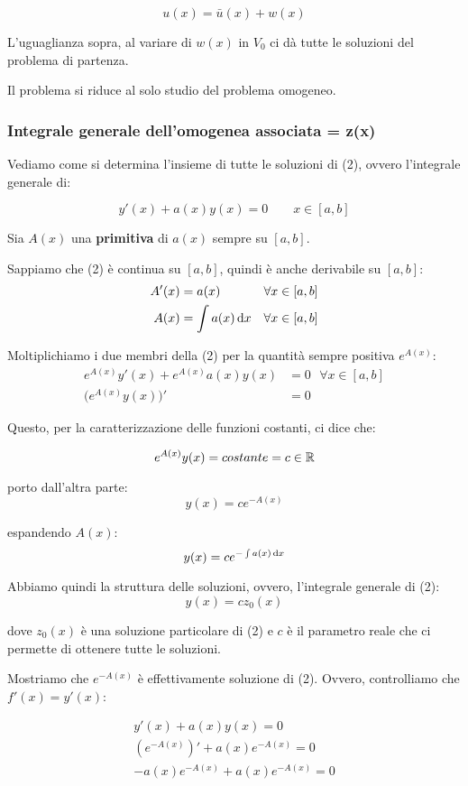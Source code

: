 \[
    u(x) = \bar u(x) +w(x)
\]

L'uguaglianza sopra, al variare di \(w(x)\) in \(V_0\) ci dà tutte le soluzioni del problema di partenza.

Il problema si riduce al solo studio del problema omogeneo.

\subsubsection{Integrale generale dell'omogenea associata = z(x)}

Vediamo come si determina l'insieme di tutte le soluzioni di (2), ovvero l'integrale generale di:

\[
    y'(x)+a(x)y(x) = 0 \qquad x \in [a,b]
\]

Sia \(A(x)\) una \textbf{primitiva} di \(a(x)\) sempre su \([a,b]\).

Sappiamo che (2) è continua su \([a,b]\), quindi è anche derivabile su \([a,b]\):
\medskip
\begin{align*}
    A'(x) & = a(x)              & \forall x \in [a,b] \\
    A(x)  & = \int a(x) \mathop{}\!\mathrm{d} x & \forall x \in [a,b]
\end{align*}

Moltiplichiamo i due membri della (2) per la quantità sempre positiva \(e^{A(x)}\):
\medskip
\begin{align*}
    e^{A(x)} y'(x) + e ^{A(x)}a(x) y(x) & = 0\ \ \ \forall x \in [a,b] \\
    \bigl(e^{A(x)} y(x)\bigr)'          & = 0
\end{align*}

Questo, per la caratterizzazione delle funzioni costanti, ci dice che:

\[
    e ^{A(x)}y(x) = costante = c \in \mathbb{R}
\]

porto dall'altra parte:
\[
    y(x) = c e ^{-A(x)}
\]

espandendo \(A(x)\):
\[
    y(x) = ce^{- \int a(x) \mathop{}\!\mathrm{d} x}
\]

Abbiamo quindi la struttura delle soluzioni, ovvero, l'integrale generale di (2):
\[
    y(x) = c z_0(x)
\]

dove \(z_0(x)\) è una soluzione particolare di (2) e \(c\) è il parametro reale che ci permette di ottenere tutte le soluzioni.

Mostriamo che \(e ^{-A(x)}\) è effettivamente soluzione di (2). Ovvero, controlliamo che \(f'(x) = y'(x)\):
\begin{spreadlines}{3mm}
    \begin{align*}
        y'(x) + a(x)y(x) = 0             \\
        (e^{-A(x)})' + a(x)e^{-A(x)} = 0 \\
        -a(x)e^{-A(x)} + a(x)e^{-A(x)} = 0
    \end{align*}
\end{spreadlines}

